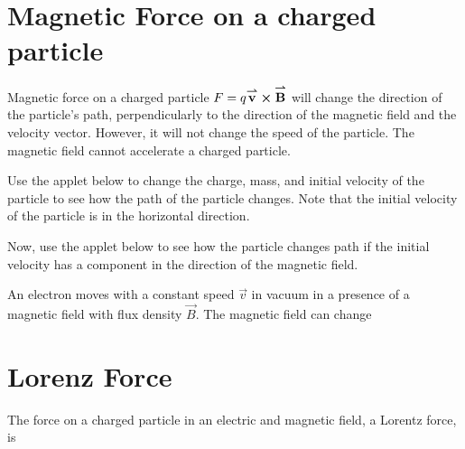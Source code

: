 \documentclass{ximera}
\begin{document}
\section{Magnetic Force on a charged particle}

Magnetic force on a charged particle $F=q {\overset{\boldsymbol{\rightharpoonup}}{\mathbf{v}}}\hspace{0in} \boldsymbol\times {\overset{\boldsymbol{\rightharpoonup}}{\mathbf{B}}}\hspace{0in}$ will change the direction of the particle's path, perpendicularly to the direction of the magnetic field and the velocity vector. However, it will not change the speed of the particle. The magnetic field cannot accelerate a charged particle.



\begin{example}

 Use the applet below to change the charge, mass, and initial velocity of the particle to see how the path of the particle changes. Note that the initial velocity of the particle is in the horizontal direction.


\end{example}


\begin{example}
Now, use the applet below to see how the particle changes path if the initial velocity has a component in the direction of the magnetic field.

\end{example}


\begin{question}

An electron moves with a constant speed $\vec{v}$ in vacuum in a presence of a magnetic field with flux density $\vec{B}$. The magnetic field can change
\begin{multipleChoice}  
\end{multipleChoice} 

\end{question}




\section{Lorenz Force}

The force on a charged particle in an electric and magnetic field, a Lorentz force, is  
\end{document}
